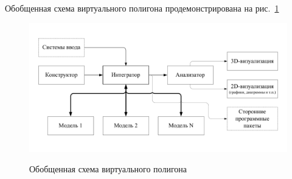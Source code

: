 Обобщенная схема виртуального полигона продемонстрирована на рис.~\ref{vtb_concept}

\begin{figure}
\begin{center}
	\includegraphics[width=130mm]{vtb_concept}
	\label{vtb_concept}
	\caption{Обобщенная схема виртуального полигона}
\end{center}
\end{figure}

